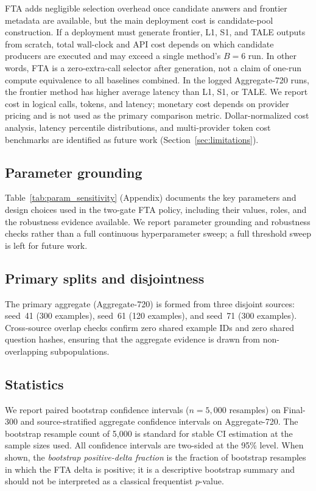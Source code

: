 FTA adds negligible selection overhead once candidate answers and frontier
metadata are available, but the main deployment cost is candidate-pool construction.
If a deployment must generate frontier, L1, S1, and TALE outputs from scratch, total
wall-clock and API cost depends on which candidate producers are executed and may
exceed a single method's $B=6$ run. In other words, FTA is a zero-extra-call selector
after generation, not a claim of one-run compute equivalence to all baselines combined.
In the logged Aggregate-720 runs, the frontier
method has higher average latency than L1, S1, or TALE.
We report cost in logical calls, tokens, and latency; monetary cost depends on provider pricing and is not used as the primary comparison metric.  Dollar-normalized cost analysis, latency percentile distributions, and multi-provider token cost benchmarks are identified as future work (Section~\ref{sec:limitations}).

\subsection{Parameter grounding}
\label{sec:param_grounding}

Table~\ref{tab:param_sensitivity} (Appendix) documents the key parameters and design choices used in the two-gate FTA policy, including their values, roles, and the robustness evidence available.  We report parameter grounding and robustness checks rather than a full continuous hyperparameter sweep; a full threshold sweep is left for future work.

\subsection{Primary splits and disjointness}
The primary aggregate (Aggregate-720) is formed from three disjoint sources: seed~41 (300 examples), seed~61 (120 examples), and seed~71 (300 examples).  Cross-source overlap checks confirm zero shared example IDs and zero shared question hashes, ensuring that the aggregate evidence is drawn from non-overlapping subpopulations.

\subsection{Statistics}
We report paired bootstrap confidence intervals \citep{efron1993bootstrap} ($n = 5{,}000$ resamples) on Final-300 and source-stratified aggregate confidence intervals on Aggregate-720.  The bootstrap resample count of 5,000 is standard for stable CI estimation at the sample sizes used.  All confidence intervals are two-sided at the 95\% level.  When shown, the \emph{bootstrap positive-delta fraction} is the fraction of bootstrap resamples in which the FTA delta is positive; it is a descriptive bootstrap summary and should not be interpreted as a classical frequentist $p$-value.
